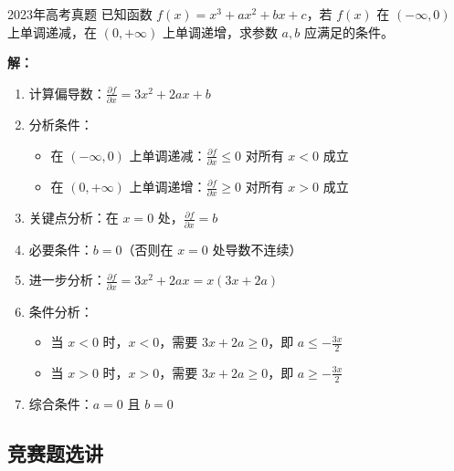 \documentclass[a4paper,11pt]{ctexart}
\newcommand{\partialder}[2]{\frac{\partial #1}{\partial #2}}
\theoremstyle{definition}
\theoremstyle{remark}
\begin{document}
\begin{examplebox}{2023年高考真题}
已知函数 $f(x) = x^3 + ax^2 + bx + c$，若 $f(x)$ 在 $(-\infty, 0)$ 上单调递减，在 $(0, +\infty)$ 上单调递增，求参数 $a, b$ 应满足的条件。

\textbf{解：}
\begin{enumerate}
    \item 计算偏导数：$\partialder{f}{x} = 3x^2 + 2ax + b$
    \item 分析条件：
    \begin{itemize}
        \item 在 $(-\infty, 0)$ 上单调递减：$\partialder{f}{x} \leq 0$ 对所有 $x < 0$ 成立
        \item 在 $(0, +\infty)$ 上单调递增：$\partialder{f}{x} \geq 0$ 对所有 $x > 0$ 成立
    \end{itemize}
    \item 关键点分析：在 $x = 0$ 处，$\partialder{f}{x} = b$
    \item 必要条件：$b = 0$（否则在 $x = 0$ 处导数不连续）
    \item 进一步分析：$\partialder{f}{x} = 3x^2 + 2ax = x(3x + 2a)$
    \item 条件分析：
    \begin{itemize}
        \item 当 $x < 0$ 时，$x < 0$，需要 $3x + 2a \geq 0$，即 $a \leq -\frac{3x}{2}$
        \item 当 $x > 0$ 时，$x > 0$，需要 $3x + 2a \geq 0$，即 $a \geq -\frac{3x}{2}$
    \end{itemize}
    \item 综合条件：$a = 0$ 且 $b = 0$
\end{enumerate}
\end{examplebox}

\subsection{竞赛题选讲}
\end{document}

